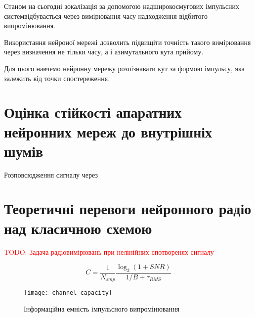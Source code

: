 Станом на сьогодні зокалізація за допомогою надширокосмугових імпульсних 
системвідбувається через вимірювання часу надходження відбитого 
випромінювання.

Використання нейроної мережі дозволить підвищіти точність такого 
вимірювання через визначення не тільки часу, а і азимутального 
кута прийому.

Для цього навчемо нейронну мережу розпізнавати кут за формою 
імпульсу, яка залежить від точки спостереження.

\section{Оцінка стійкості апаратних нейронних мереж до внутрішніх шумів}

Розповсюдження сигналу через 

\section{Теоретичні перевоги нейронного радіо над класичною схемою}

\textcolor{red}{TODO: Задача радіовимірювань при нелінійних спотворенях сигналу}

\begin{equation}
C = \frac{1}{N_{smp}} \frac{\log_2 \left( 1 + SNR \right)}{1/B + \tau_{RMS}} 
\end{equation}

\begin{figure}[htbp] \begin{center}
\texttt{[image: channel\_capacity]}
\caption{Інформаційна емність імпульсного випромінювання} \label{fig:info_cap}
\end{center} \end{figure}
